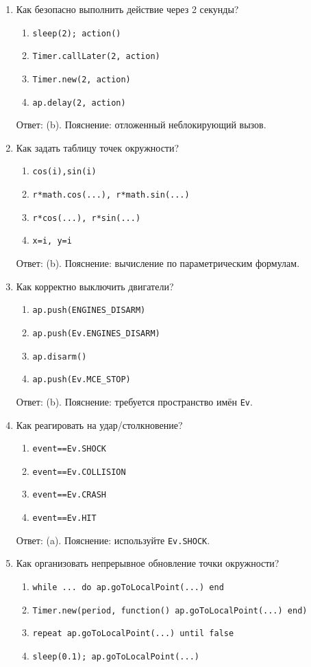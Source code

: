 \begin{enumerate}
  Ответ: (b). Пояснение: \texttt{updateYaw} принимает радианы.
  \item Как безопасно выполнить действие через 2 секунды? 
  \begin{enumerate}[label=(\alph*)] \item \texttt{sleep(2); action()} \item \texttt{Timer.callLater(2, action)} \item \texttt{Timer.new(2, action)} \item \texttt{ap.delay(2, action)} \end{enumerate}
  Ответ: (b). Пояснение: отложенный неблокирующий вызов.
  \item Как задать таблицу точек окружности? 
  \begin{enumerate}[label=(\alph*)] \item \texttt{{cos(i),sin(i)}} \item \texttt{{r*math.cos(...), r*math.sin(...)}} \item \texttt{{r*cos(...), r*sin(...)}} \item \texttt{{x=i, y=i}} \end{enumerate}
  Ответ: (b). Пояснение: вычисление по параметрическим формулам.
  \item Как корректно выключить двигатели? 
  \begin{enumerate}[label=(\alph*)] \item \texttt{ap.push(ENGINES\_DISARM)} \item \texttt{ap.push(Ev.ENGINES\_DISARM)} \item \texttt{ap.disarm()} \item \texttt{ap.push(Ev.MCE\_STOP)} \end{enumerate}
  Ответ: (b). Пояснение: требуется пространство имён \texttt{Ev}.
  \item Как реагировать на удар/столкновение? 
  \begin{enumerate}[label=(\alph*)] \item \texttt{event==Ev.SHOCK} \item \texttt{event==Ev.COLLISION} \item \texttt{event==Ev.CRASH} \item \texttt{event==Ev.HIT} \end{enumerate}
  Ответ: (a). Пояснение: используйте \texttt{Ev.SHOCK}.
  \item Как организовать непрерывное обновление точки окружности? 
  \begin{enumerate}[label=(\alph*)] \item \texttt{while ... do ap.goToLocalPoint(...) end} \item \texttt{Timer.new(period, function() ap.goToLocalPoint(...) end)} \item \texttt{repeat ap.goToLocalPoint(...) until false} \item \texttt{sleep(0.1); ap.goToLocalPoint(...)} \end{enumerate}

\end{enumerate}
